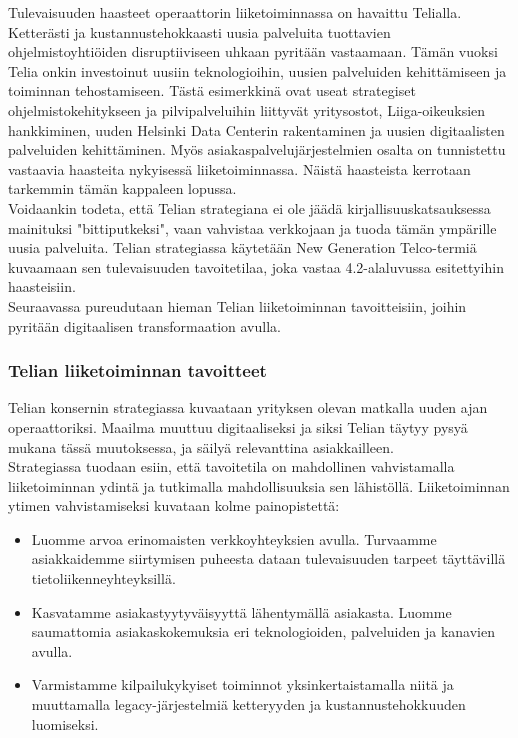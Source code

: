 \documentclass[finnish,12pt,a4paper,pdftex]{article}
\begin{document}
Tulevaisuuden haasteet operaattorin liiketoiminnassa on havaittu Telialla. Ketterästi ja kustannustehokkaasti uusia palveluita tuottavien ohjelmistoyhtiöiden disruptiiviseen uhkaan pyritään vastaamaan.
Tämän vuoksi Telia onkin investoinut uusiin teknologioihin, uusien palveluiden kehittämiseen ja toiminnan tehostamiseen. Tästä esimerkkinä ovat useat strategiset ohjelmistokehitykseen ja pilvipalveluihin liittyvät yritysostot, Liiga-oikeuksien hankkiminen, uuden Helsinki Data Centerin rakentaminen ja uusien digitaalisten palveluiden kehittäminen. Myös asiakaspalvelujärjestelmien osalta on tunnistettu vastaavia haasteita nykyisessä liiketoiminnassa. Näistä haasteista kerrotaan tarkemmin tämän kappaleen lopussa.\\

Voidaankin todeta, että Telian strategiana ei ole jäädä kirjallisuuskatsauksessa mainituksi "bittiputkeksi", vaan vahvistaa verkkojaan ja tuoda tämän ympärille uusia palveluita. Telian strategiassa käytetään New Generation Telco-termiä kuvaamaan sen tulevaisuuden tavoitetilaa, joka vastaa 4.2-alaluvussa esitettyihin haasteisiin.\\

Seuraavassa pureudutaan hieman Telian liiketoiminnan tavoitteisiin, joihin pyritään digitaalisen transformaation avulla.

\subsubsection{Telian liiketoiminnan tavoitteet}

Telian konsernin strategiassa \citeyearpar{telia} kuvaataan yrityksen olevan matkalla uuden ajan operaattoriksi. Maailma muuttuu digitaaliseksi ja siksi Telian täytyy pysyä mukana tässä muutoksessa, ja säilyä relevanttina asiakkailleen.  \\

Strategiassa tuodaan esiin, että tavoitetila on mahdollinen vahvistamalla liiketoiminnan ydintä ja tutkimalla mahdollisuuksia sen lähistöllä. Liiketoiminnan ytimen vahvistamiseksi kuvataan kolme painopistettä:
\begin{itemize}
    \item Luomme arvoa erinomaisten verkkoyhteyksien avulla. Turvaamme asiakkaidemme siirtymisen puheesta dataan tulevaisuuden tarpeet täyttävillä tietoliikenneyhteyksillä.
    \item Kasvatamme asiakastyytyväisyyttä lähentymällä asiakasta. Luomme saumattomia asiakaskokemuksia eri teknologioiden, palveluiden ja kanavien avulla.
    \item Varmistamme kilpailukykyiset toiminnot yksinkertaistamalla niitä ja muuttamalla legacy-järjestelmiä ketteryyden ja kustannustehokkuuden luomiseksi.
\end{itemize}
\end{document}

